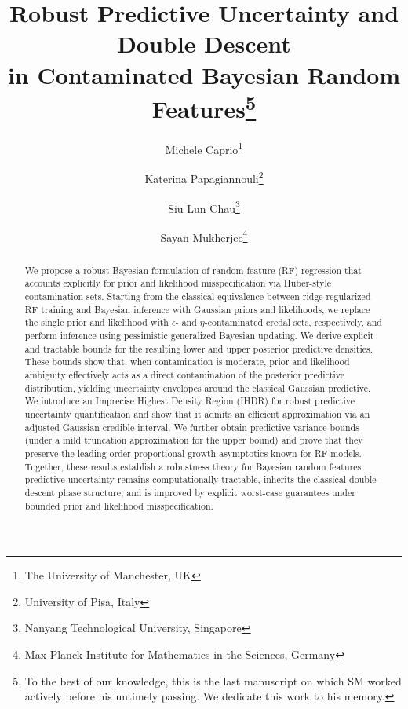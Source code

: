 \documentclass[12pt, english, oneside, a4paper]{article}
\title{Robust Predictive Uncertainty and Double Descent \\ in Contaminated Bayesian Random Features\thanks{To the best of our knowledge, this is the last manuscript on which SM worked actively before his untimely passing. We dedicate this work to his memory.}}
\author{Michele Caprio\thanks{The University of Manchester, UK}
\and Katerina Papagiannouli\thanks{University of Pisa, Italy}
  \and Siu Lun Chau\thanks{Nanyang Technological University, Singapore}
  \and Sayan Mukherjee\thanks{Max Planck Institute for Mathematics in the Sciences, Germany}}
\date{}
\begin{document}
\maketitle

\begin{abstract}

We propose a robust Bayesian formulation of random feature (RF) regression that accounts explicitly for prior and likelihood misspecification via Huber-style contamination sets. Starting from the classical equivalence between ridge-regularized RF training and Bayesian inference with Gaussian priors and likelihoods, we replace the single prior and likelihood with $\epsilon$- and $\eta$-contaminated credal sets, respectively, and perform inference using pessimistic generalized Bayesian updating. We derive explicit and tractable bounds for the resulting lower and upper posterior predictive densities. These bounds show that, when contamination is moderate, prior and likelihood ambiguity effectively acts as a direct contamination of the posterior predictive distribution, yielding uncertainty envelopes around the classical Gaussian predictive. We introduce an Imprecise Highest Density Region (IHDR) for robust predictive uncertainty quantification and show that it admits an efficient approximation via an adjusted Gaussian credible interval. We further obtain predictive variance bounds (under a mild truncation approximation for the upper bound) and prove that they preserve the leading-order proportional-growth asymptotics known for RF models. Together, these results establish a robustness theory for Bayesian random features: predictive uncertainty remains computationally tractable, inherits the classical double-descent phase structure, and is improved by explicit worst-case guarantees under bounded prior and likelihood misspecification.


\end{abstract}
\end{document}
